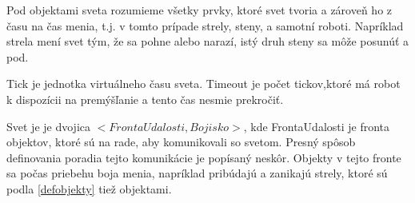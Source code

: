 \begin{definicia} 
Pod objektami sveta rozumieme všetky prvky, ktoré svet tvoria a zároveň ho z času na čas menia, t.j. v tomto prípade strely, steny, a samotní roboti. Napríklad strela mení svet tým, že sa pohne alebo narazí, istý druh steny sa môže posunúť a pod.
\end{definicia}

\begin{definicia}
Tick je jednotka virtuálneho času sveta. Timeout je počet tickov,ktoré má robot k dispozícii na premýšľanie a tento čas nesmie prekročiť.
\end{definicia}

\begin{definicia} 
Svet je je dvojica $< FrontaUdalosti, Bojisko >$, kde FrontaUdalosti je fronta objektov, ktoré sú na rade, aby komunikovali so svetom. Presný spôsob definovania poradia tejto komunikácie je popísaný neskôr. Objekty v tejto fronte sa počas priebehu boja menia, napríklad pribúdajú a zanikajú strely, ktoré sú podla \ref{defobjekty} tiež objektami.
\end{definicia}

